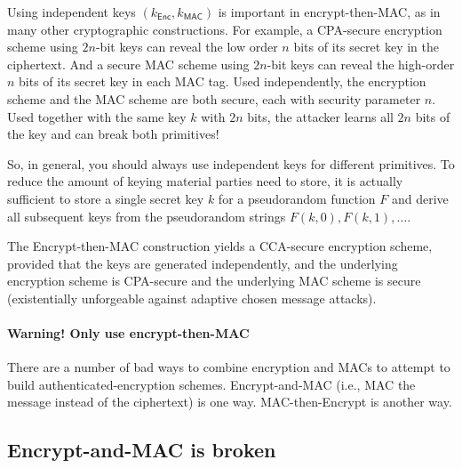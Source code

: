 Using independent keys $(k_\mathsf{Enc}, k_\mathsf{MAC})$ is important 
in encrypt-then-MAC, as in many other cryptographic constructions.
For example, a CPA-secure encryption scheme using $2n$-bit keys can reveal
the low order $n$ bits of its secret key in the ciphertext.
And a secure MAC scheme using $2n$-bit keys can reveal the high-order
$n$ bits of its secret key in each MAC tag.
Used independently, the encryption scheme and the MAC scheme are both
secure, each with security parameter $n$.
Used together with the same key $k$ with $2n$ bits, the attacker learns all $2n$ bits
of the key and can break both primitives!

So, in general, you should always use independent keys for different primitives.
To reduce the amount of keying material parties need to store, it is actually 
sufficient to store a single secret key $k$ for a pseudorandom function $F$
and derive all subsequent keys from the pseudorandom strings $F(k, 0), F(k, 1), \dots$.

\begin{theorem}[Informal]
The Encrypt-then-MAC construction yields a CCA-secure encryption scheme,
provided that the keys are generated independently, and the underlying encryption scheme is CPA-secure and the
underlying MAC scheme is secure (existentially unforgeable against adaptive chosen message attacks).
\end{theorem}

\paragraph{Warning! \textbf{Only} use encrypt-then-MAC}
There are a number of bad ways to combine encryption and MACs to attempt to
build authenticated-encryption schemes.
Encrypt-and-MAC (i.e., MAC the message instead of the ciphertext) is one
way.  MAC-then-Encrypt is another way.

\newcommand{\bits}{\{0,1\}}
\newcommand{\Tag}{\operatorname{Tag}}
\newcommand{\Vrfy}{\operatorname{Verify}}
\newcommand{\EncAM}{\operatorname{Enc}^{\mathrm{E\&M}}}
\newcommand{\DecAM}{\operatorname{Dec}^{\mathrm{E\&M}}}
\newcommand{\EncME}{\operatorname{Enc}^{\mathrm{MtE}}}
\newcommand{\DecME}{\operatorname{Dec}^{\mathrm{MtE}}}

\subsection{Encrypt-and-MAC is broken}

